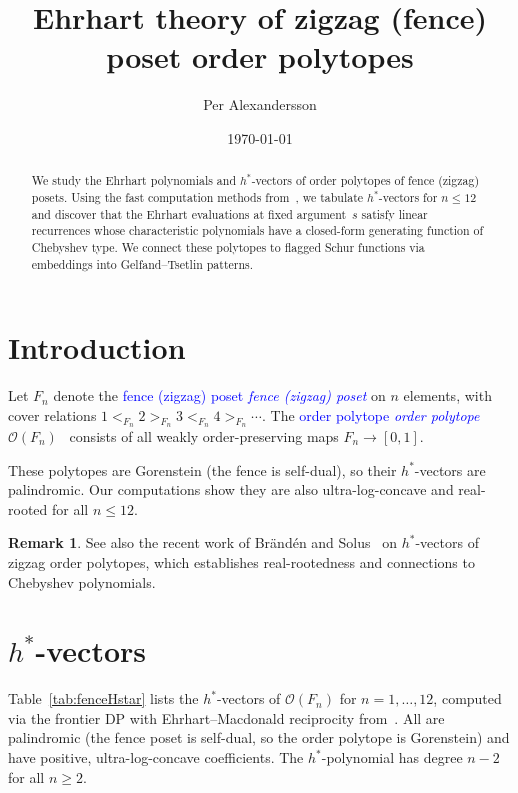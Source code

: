 \documentclass[11pt,reqno]{amsart}
\title{Ehrhart theory of zigzag (fence) poset order polytopes}
\author{Per Alexandersson}
\date{\today}
\theoremstyle{definition}
\newtheorem{remark}[theorem]{Remark}
\newcommand{\defin}[1]{%
\relax\ifmmode%
\textcolor{blue}{#1}%
\else \textcolor{blue}{\emph{#1}}%
\fi%
}
\begin{document}
\begin{abstract}
We study the Ehrhart polynomials and $h^*$-vectors of order polytopes
of fence (zigzag) posets. Using the fast computation methods
from~\cite{AlexanderssonEhrhart}, we tabulate $h^*$-vectors
for $n \leq 12$ and discover that the Ehrhart evaluations at
fixed argument~$s$ satisfy linear recurrences whose characteristic
polynomials have a closed-form generating function of Chebyshev type.
We connect these polytopes to flagged Schur functions via embeddings
into Gelfand--Tsetlin patterns.
\end{abstract}

\maketitle


\section{Introduction}

Let $F_n$ denote the \defin{fence (zigzag) poset} on $n$ elements,
with cover relations $1 <_{F_n} 2 >_{F_n} 3 <_{F_n} 4 >_{F_n} \dotsb$.
The \defin{order polytope} $\mathcal{O}(F_n)$~\cite{Stanley1986}
consists of all weakly order-preserving maps $F_n \to [0,1]$.

These polytopes are Gorenstein (the fence is self-dual), so their
$h^*$-vectors are palindromic.  Our computations show they are also
ultra-log-concave and real-rooted for all $n \leq 12$.

\begin{remark}
See also the recent work of Br\"and\'en and
Solus~\cite{BrandenSolus2025zigzag} on $h^*$-vectors of
zigzag order polytopes, which establishes real-rootedness and
connections to Chebyshev polynomials.
\end{remark}


\section{\texorpdfstring{$h^*$}{h*}-vectors}\label{sec:hstar}

Table~\ref{tab:fenceHstar} lists the $h^*$-vectors of
$\mathcal{O}(F_n)$ for $n = 1, \dotsc, 12$, computed via
the frontier DP with Ehrhart--Macdonald reciprocity
from~\cite{AlexanderssonEhrhart}.
All are palindromic (the fence poset is self-dual, so the order polytope
is Gorenstein) and have positive, ultra-log-concave coefficients.
The $h^*$-polynomial has degree $n-2$ for all $n \geq 2$.
\end{document}

